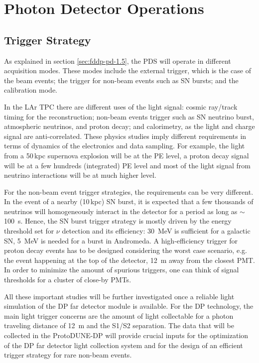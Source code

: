 \section{Photon Detector Operations}
\label{sec:fddp-pd-7}

\subsection{Trigger Strategy}
\label{sec:fddp-pd-7.2}

As explained in section \ref{sec:fddp-pd-1.5}, the PDS will operate in different acquisition modes. These modes include the external trigger, which is the case of the beam events; the trigger for non-beam events such as SN bursts; and the calibration mode. 

In the LAr TPC there are different uses of the light signal: cosmic ray/track timing for the reconstruction; non-beam events trigger such as SN neutrino burst, atmospheric neutrinos, and proton decay; and calorimetry, as the light and charge signal are anti-correlated. These physics studies imply different requirements in terms of dynamics of the electronics and data sampling. For example, the light from a 50\,kpc supernova explosion will be at the PE level, a proton decay signal will be at a few hundreds (integrated) PE level and most of the light signal from neutrino interactions will be at much higher level. 

For the non-beam event trigger strategies, the requirements can be very different. In the event of a nearby (10\,kpc) SN burst, it is expected that a few thousands of neutrinos will homogeneously interact in the detector for a period as long as $\sim$\SI{100}{s}. Hence, the SN burst trigger strategy is mostly driven by the energy threshold set for $\nu$ detection and its efficiency: \SI{30}{MeV} is sufficient for a galactic SN, \SI{5}{MeV} is needed for a burst in Andromeda. A high-efficiency trigger for proton decay events has to be designed considering the worst case scenario, e.g. the event happening at the top of the detector, \SI{12}{m} away from the closest PMT. In order to minimize the amount of spurious triggers, one can think of signal thresholds for a cluster of close-by PMTs.

All these important studies will be further investigated once a reliable light simulation of the DP far detector module is available. For the DP technology, the main light trigger concerns are the amount of light collectable for a photon traveling distance of \SI{12}{m} and the S1/S2 separation. The data that will be collected in the ProtoDUNE-DP will provide crucial inputs for the optimization of the DP far detector light collection system and for the design of an efficient trigger strategy for rare non-beam events. 

